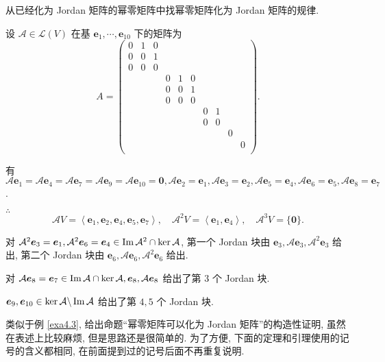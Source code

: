 \documentclass[color=black,device=normal,lang=cn,mode=geye]{elegantnote}
\begin{document}
从已经化为 Jordan 矩阵的幂零矩阵中找幂零矩阵化为 Jordan 矩阵的规律.
\begin{example}\label{exa4.3}
    设 $\mathcal{A}\in\mathcal{L}(V)$ 在基 $\boldsymbol{e}_1,\cdots,\boldsymbol{e}_{10}$ 下的矩阵为
    \[A=\begin{pmatrix}
        0 & 1 & 0 \\
        0 & 0 & 1 \\
        0 & 0 & 0 \\
        &&& 0 & 1 & 0 \\
        &&& 0 & 0 & 1 \\
        &&& 0 & 0 & 0 \\
        &&&&&& 0 & 1 \\
        &&&&&& 0 & 0 \\
        &&&&&&&& 0 \\
        &&&&&&&&& 0 \\
    \end{pmatrix}.\]

    有 $\mathcal{A}\boldsymbol{e}_1=\mathcal{A}\boldsymbol{e}_4=\mathcal{A}\boldsymbol{e}_7=\mathcal{A}\boldsymbol{e}_9=\mathcal{A}\boldsymbol{e}_{10}=\boldsymbol{0},\mathcal{A}\boldsymbol{e}_2=\boldsymbol{e}_1,\mathcal{A}\boldsymbol{e}_3=\boldsymbol{e}_2,\mathcal{A}\boldsymbol{e}_5=\boldsymbol{e}_4,\mathcal{A}\boldsymbol{e}_6=\boldsymbol{e}_5,\mathcal{A}\boldsymbol{e}_8=\boldsymbol{e}_7$.

    $\therefore$
    \[\mathcal{A}V=\left<\boldsymbol{e}_1,\boldsymbol{e}_2,\boldsymbol{e}_4,\boldsymbol{e}_5,\boldsymbol{e}_7\right>,\quad\mathcal{A}^2V=\left<\boldsymbol{e}_1,\boldsymbol{e}_4\right>,\quad\mathcal{A}^3V=\{\boldsymbol{0}\}.\]

    对 $\mathcal{A}^2\boldsymbol{e}_3=\boldsymbol{e}_1,\mathcal{A}^2\boldsymbol{e}_6=\boldsymbol{e}_4\in\operatorname{Im} \mathcal{A}^2\cap\ker\mathcal{A}$, 第一个 Jordan 块由 $\boldsymbol{e}_3,\mathcal{A}\boldsymbol{e}_3,\mathcal{A}^2\boldsymbol{e}_3$ 给出, 第二个 Jordan 块由 $\boldsymbol{e}_6,\mathcal{A}\boldsymbol{e}_6,\mathcal{A}^2\boldsymbol{e}_6$ 给出.

    对 $\mathcal{A}\boldsymbol{e}_8=\boldsymbol{e}_7\in\operatorname{Im} \mathcal{A}\cap\ker\mathcal{A},\boldsymbol{e}_8,\mathcal{A}\boldsymbol{e}_8$ 给出了第 $3$ 个 Jordan 块.

    $\boldsymbol{e}_9,\boldsymbol{e}_{10}\in\ker\mathcal{A}\backslash\operatorname{Im}\mathcal{A}$ 给出了第 $4,5$ 个 Jordan 块.
\end{example}

类似于例 \ref{exa4.3}, 给出命题``幂零矩阵可以化为 Jordan 矩阵''的构造性证明, 虽然在表述上比较麻烦, 但是思路还是很简单的. 为了方便, 下面的定理和引理使用的记号的含义都相同, 在前面提到过的记号后面不再重复说明.
\end{document}
